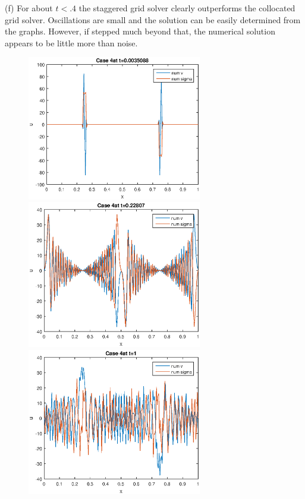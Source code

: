 (f) For about $t<.4$ the staggered grid solver clearly outperforms the collocated grid solver. Oscillations are small and the solution can be easily determined from the graphs. However, if stepped much beyond that, the numerical solution appears to be little more than noise. 
\begin{figure}[b]
\centering
\includegraphics[width=3in]{initStag4}
\includegraphics[width=3in]{midStag4}\\
\includegraphics[width=3in]{endStag4}
\end{figure}
\eenum

\pagebreak

